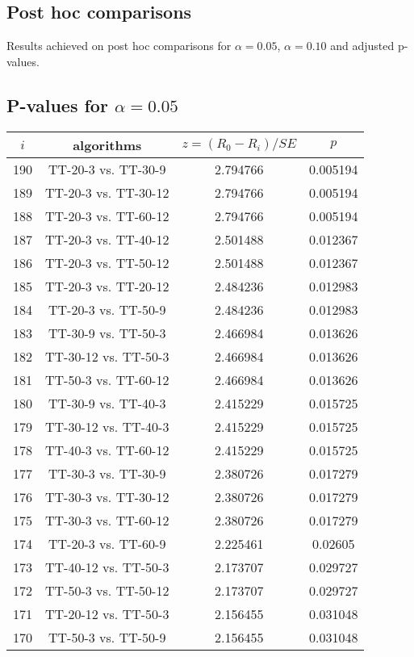 \documentclass[a4paper,10pt]{article}
\begin{document}
\begin{landscape}
\section{Post hoc comparisons}

Results achieved on post hoc comparisons for $\alpha = 0.05$, $\alpha = 0.10$ and adjusted p-values.

\subsection{P-values for $\alpha=0.05$}

\begin{table}[!htp]
\centering\scriptsize
\begin{tabular}{cccc}
$i$&algorithms&$z=(R_0 - R_i)/SE$&$p$\\
\hline190&TT-20-3 vs. TT-30-9&2.794766&0.005194\\
189&TT-20-3 vs. TT-30-12&2.794766&0.005194\\
188&TT-20-3 vs. TT-60-12&2.794766&0.005194\\
187&TT-20-3 vs. TT-40-12&2.501488&0.012367\\
186&TT-20-3 vs. TT-50-12&2.501488&0.012367\\
185&TT-20-3 vs. TT-20-12&2.484236&0.012983\\
184&TT-20-3 vs. TT-50-9&2.484236&0.012983\\
183&TT-30-9 vs. TT-50-3&2.466984&0.013626\\
182&TT-30-12 vs. TT-50-3&2.466984&0.013626\\
181&TT-50-3 vs. TT-60-12&2.466984&0.013626\\
180&TT-30-9 vs. TT-40-3&2.415229&0.015725\\
179&TT-30-12 vs. TT-40-3&2.415229&0.015725\\
178&TT-40-3 vs. TT-60-12&2.415229&0.015725\\
177&TT-30-3 vs. TT-30-9&2.380726&0.017279\\
176&TT-30-3 vs. TT-30-12&2.380726&0.017279\\
175&TT-30-3 vs. TT-60-12&2.380726&0.017279\\
174&TT-20-3 vs. TT-60-9&2.225461&0.02605\\
173&TT-40-12 vs. TT-50-3&2.173707&0.029727\\
172&TT-50-3 vs. TT-50-12&2.173707&0.029727\\
171&TT-20-12 vs. TT-50-3&2.156455&0.031048\\
170&TT-50-3 vs. TT-50-9&2.156455&0.031048\\

\end{tabular}
\end{table}
\end{landscape}
\end{document}

